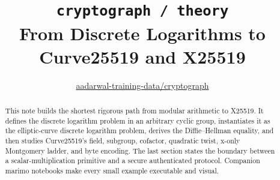 

\title{\texttt{cryptograph / theory}\\[0.25em]
\large From Discrete Logarithms to Curve25519 and X25519}
\author{\href{https://github.com/aadarwal-training-data/cryptograph}{aadarwal-training-data/cryptograph}}
\date{}


\maketitle

\begin{abstract}
This note builds the shortest rigorous path from modular arithmetic to X25519.
It defines the discrete logarithm problem in an arbitrary cyclic group,
instantiates it as the elliptic-curve discrete logarithm problem, derives the
Diffie--Hellman equality, and then studies Curve25519's field, subgroup,
cofactor, quadratic twist, x-only Montgomery ladder, and byte encoding. The
last section states the boundary between a scalar-multiplication primitive and
a secure authenticated protocol. Companion marimo notebooks make every small
example executable and visual.
\end{abstract}

\begin{center}
\end{center}

\tableofcontents













